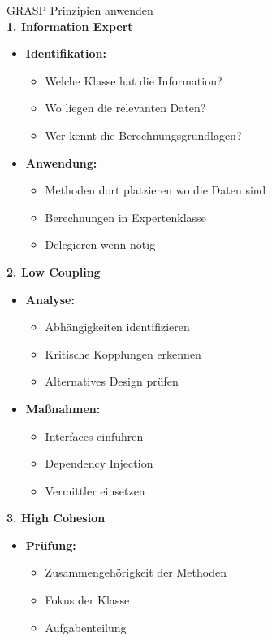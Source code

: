 \begin{KR}{GRASP Prinzipien anwenden}\\
\textbf{1. Information Expert}
\begin{itemize}
    \item \textbf{Identifikation:}
    \begin{itemize}
        \item Welche Klasse hat die Information?
        \item Wo liegen die relevanten Daten?
        \item Wer kennt die Berechnungsgrundlagen?
    \end{itemize}
    
    \item \textbf{Anwendung:}
    \begin{itemize}
        \item Methoden dort platzieren wo die Daten sind
        \item Berechnungen in Expertenklasse
        \item Delegieren wenn nötig
    \end{itemize}
\end{itemize}

\textbf{2. Low Coupling}
\begin{itemize}
    \item \textbf{Analyse:}
    \begin{itemize}
        \item Abhängigkeiten identifizieren
        \item Kritische Kopplungen erkennen
        \item Alternatives Design prüfen
    \end{itemize}
    
    \item \textbf{Maßnahmen:}
    \begin{itemize}
        \item Interfaces einführen
        \item Dependency Injection
        \item Vermittler einsetzen
    \end{itemize}
\end{itemize}

\textbf{3. High Cohesion}
\begin{itemize}
    \item \textbf{Prüfung:}
    \begin{itemize}
        \item Zusammengehörigkeit der Methoden
        \item Fokus der Klasse
        \item Aufgabenteilung
    \end{itemize}
    

\end{itemize}
\end{KR}
